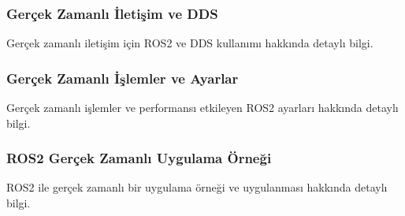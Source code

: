 \subsubsection{Gerçek Zamanlı İletişim ve DDS}
Gerçek zamanlı iletişim için ROS2 ve DDS kullanımı hakkında detaylı bilgi.

\subsubsection{Gerçek Zamanlı İşlemler ve Ayarlar}
Gerçek zamanlı işlemler ve performansı etkileyen ROS2 ayarları hakkında detaylı bilgi.

\subsubsection{ROS2 Gerçek Zamanlı Uygulama Örneği}
ROS2 ile gerçek zamanlı bir uygulama örneği ve uygulanması hakkında detaylı bilgi.
